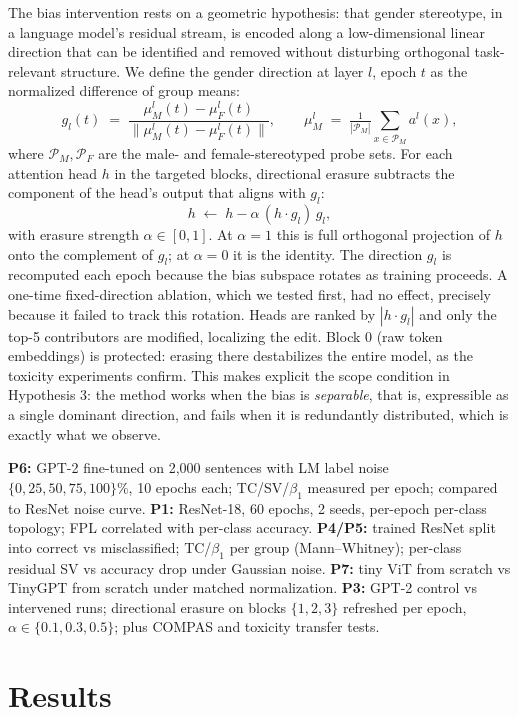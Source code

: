 \documentclass[10pt]{article}
\begin{document}
The bias intervention rests on a geometric hypothesis: that gender stereotype, in a language model's residual stream, is encoded along a low-dimensional linear direction that can be identified and removed without disturbing orthogonal task-relevant structure. We define the gender direction at layer $l$, epoch $t$ as the normalized difference of group means:
\[
g_l(t) \;=\; \frac{\mu^{l}_{M}(t)-\mu^{l}_{F}(t)}{\|\mu^{l}_{M}(t)-\mu^{l}_{F}(t)\|},
\qquad
\mu^{l}_{M} \;=\; \tfrac{1}{|\mathcal{P}_M|}\sum_{x\in\mathcal{P}_M} a^{l}(x),
\]
where $\mathcal{P}_M,\mathcal{P}_F$ are the male- and female-stereotyped probe sets. For each attention head $h$ in the targeted blocks, directional erasure subtracts the component of the head's output that aligns with $g_l$:
\[
h \;\leftarrow\; h-\alpha\,(h\cdot g_l)\,g_l,
\]
with erasure strength $\alpha\in[0,1]$. At $\alpha=1$ this is full orthogonal projection of $h$ onto the complement of $g_l$; at $\alpha=0$ it is the identity. The direction $g_l$ is recomputed each epoch because the bias subspace rotates as training proceeds. A one-time fixed-direction ablation, which we tested first, had no effect, precisely because it failed to track this rotation. Heads are ranked by $|h\cdot g_l|$ and only the top-5 contributors are modified, localizing the edit. Block 0 (raw token embeddings) is protected: erasing there destabilizes the entire model, as the toxicity experiments confirm. This makes explicit the scope condition in Hypothesis 3: the method works when the bias is \emph{separable}, that is, expressible as a single dominant direction, and fails when it is redundantly distributed, which is exactly what we observe.

\textbf{P6:} GPT-2 fine-tuned on 2,000 sentences with LM label noise $\{0,25,50,75,100\}\%$, 10 epochs each; TC/SV/$\beta_1$ measured per epoch; compared to ResNet noise curve. \textbf{P1:} ResNet-18, 60 epochs, 2 seeds, per-epoch per-class topology; FPL correlated with per-class accuracy. \textbf{P4/P5:} trained ResNet split into correct vs misclassified; TC/$\beta_1$ per group (Mann--Whitney); per-class residual SV vs accuracy drop under Gaussian noise. \textbf{P7:} tiny ViT from scratch vs TinyGPT from scratch under matched normalization. \textbf{P3:} GPT-2 control vs intervened runs; directional erasure on blocks $\{1,2,3\}$ refreshed per epoch, $\alpha\in\{0.1,0.3,0.5\}$; plus COMPAS and toxicity transfer tests.

\section{Results}
\end{document}
